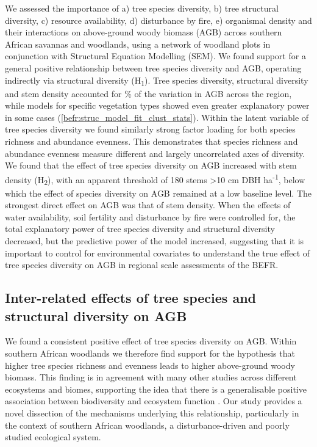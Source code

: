 \begin{refsection}
We assessed the importance of a) tree species diversity, b) tree structural diversity, c) resource availability, d) disturbance by fire, e) organismal density and their interactions on above-ground woody biomass (AGB) across southern African savannas and woodlands, using a network of \nplots{} woodland plots in conjunction with Structural Equation Modelling (SEM). We found support for a general positive relationship between tree species diversity and AGB, operating indirectly via structural diversity (H\textsubscript{1}). Tree species diversity, structural diversity and stem density accounted for \smrsq{}\% of the variation in AGB across the region, while models for specific vegetation types showed even greater explanatory power in some cases (\autoref{befr:struc_model_fit_clust_stats}). Within the latent variable of tree species diversity we found similarly strong factor loading for both species richness and abundance evenness. This demonstrates that species richness and abundance evenness measure different and largely uncorrelated axes of diversity. We found that the effect of tree species diversity on AGB increased with stem density (H\textsubscript{2}), with an apparent threshold of 180 stems >10 cm DBH ha\textsuperscript{-1}, below which the effect of species diversity on AGB remained at a low baseline level. The strongest direct effect on AGB was that of stem density. When the effects of water availability, soil fertility and disturbance by fire were controlled for, the total explanatory power of tree species diversity and structural diversity decreased, but the predictive power of the model increased, suggesting that it is important to control for environmental covariates to understand the true effect of tree species diversity on AGB in regional scale assessments of the BEFR.

\subsection{Inter-related effects of tree species and structural diversity on AGB}
\label{befr:ssec:struc_agb}

We found a consistent positive effect of tree species diversity on AGB. Within southern African woodlands we therefore find support for the hypothesis that higher tree species richness and evenness leads to higher above-ground woody biomass. This finding is in agreement with many other studies across different ecosystems and biomes, supporting the idea that there is a generalisable positive association between biodiversity and ecosystem function \citep{Liang2016, Cardinale2009}. Our study provides a novel dissection of the mechanisms underlying this relationship, particularly in the context of southern African woodlands, a disturbance-driven and poorly studied ecological system.


\end{refsection}

